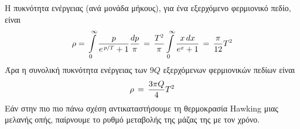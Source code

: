 Η πυκνότητα ενέργειας (ανά μονάδα μήκους), για ένα εξερχόμενο φερμιονικό πεδίο, είναι
\begin{equation}\label{flux of energy in corona for one type of particle}
     \rho=\, \int\limits_0^\infty\frac{p}{e\superscr{\,p/T}+1} \frac{dp}{\pi} \,=\, \frac{T\superscr{2}}{\pi}\int\limits_0^\infty\frac{x\,dx}{e\superscr{x}+1}\,=\,\frac{\pi}{12}T\superscr{2}
\end{equation}
Άρα η συνολική πυκνότητα ενέργειας των $9Q$ εξερχόμενων φερμιονικών πεδίων είναι 
\begin{equation}\label{flux of energy in corona for degenerate system}
     \rho\,=\,\frac{3\pi Q}{4}T\superscr{2}
\end{equation}
Εάν στην πιο πιο πάνω σχέση αντικαταστήσουμε τη θερμοκρασία Hawking μιας μελανής οπής, παίρνουμε το ρυθμό μεταβολής της μάζας της με τον χρόνο. 
\\


